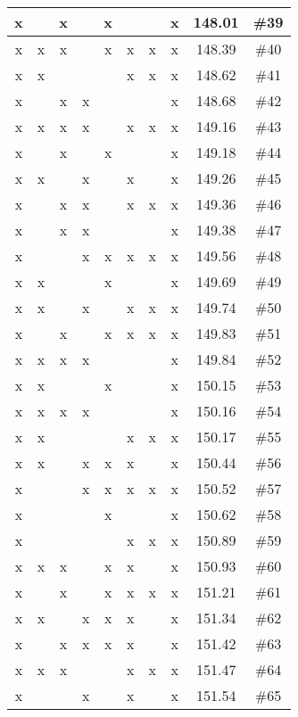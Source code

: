 \begin{center}
\begin{longtable}{|c|c|c|c|c|c|c|c|c|c|}
 x &  &  x &  &  x &  &  &  x & 148.01 & \#39 \\ \hline
 x &  x &  x &  &  x &  x &  x &  x & 148.39 & \#40 \\ \hline
 x &  x &  &  &  &  x &  x &  x & 148.62 & \#41 \\ \hline
 x &  &  x &  x &  &  &  &  x & 148.68 & \#42 \\ \hline
 x &  x &  x &  x &  &  x &  x &  x & 149.16 & \#43 \\ \hline
 x &  &  x &  &  x &  &  &  x & 149.18 & \#44 \\ \hline
 x &  x &  &  x &  &  x &  &  x & 149.26 & \#45 \\ \hline
 x &  &  x &  x &  &  x &  x &  x & 149.36 & \#46 \\ \hline
 x &  &  x &  x &  &  &  &  x & 149.38 & \#47 \\ \hline
 x &  &  &  x &  x &  x &  x &  x & 149.56 & \#48 \\ \hline
 x &  x &  &  &  x &  &  &  x & 149.69 & \#49 \\ \hline
 x &  x &  &  x &  &  x &  x &  x & 149.74 & \#50 \\ \hline
 x &  &  x &  &  x &  x &  x &  x & 149.83 & \#51 \\ \hline
 x &  x &  x &  x &  &  &  &  x & 149.84 & \#52 \\ \hline
 x &  x &  &  &  x &  &  &  x & 150.15 & \#53 \\ \hline
 x &  x &  x &  x &  &  &  &  x & 150.16 & \#54 \\ \hline
 x &  x &  &  &  &  x &  x &  x & 150.17 & \#55 \\ \hline
 x &  x &  &  x &  x &  x &  &  x & 150.44 & \#56 \\ \hline
 x &  &  &  x &  x &  x &  x &  x & 150.52 & \#57 \\ \hline
 x &  &  &  &  x &  &  &  x & 150.62 & \#58 \\ \hline
 x &  &  &  &  &  x &  x &  x & 150.89 & \#59 \\ \hline
 x &  x &  x &  &  x &  x &  &  x & 150.93 & \#60 \\ \hline
 x &  &  x &  &  x &  x &  x &  x & 151.21 & \#61 \\ \hline
 x &  x &  &  x &  x &  x &  &  x & 151.34 & \#62 \\ \hline
 x &  &  x &  x &  x &  x &  &  x & 151.42 & \#63 \\ \hline
 x &  x &  x &  &  &  x &  x &  x & 151.47 & \#64 \\ \hline
 x &  &  &  x &  &  x &  &  x & 151.54 & \#65 \\ \hline

\end{longtable}
\end{center}
